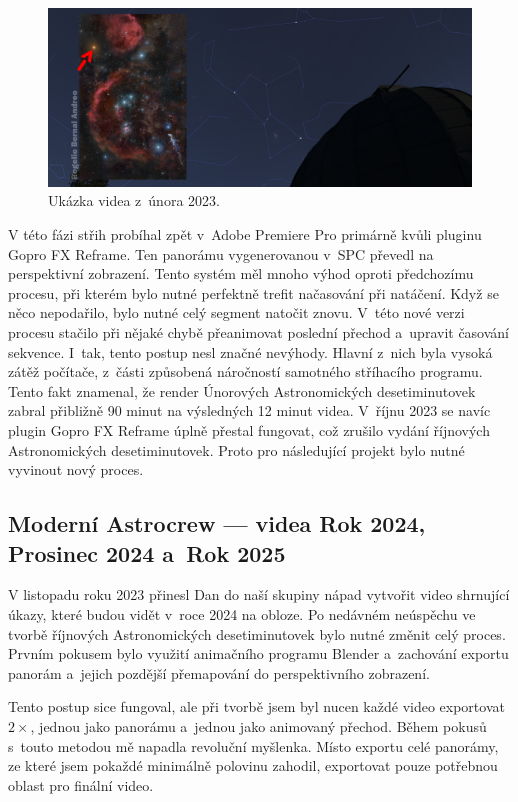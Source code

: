 \documentclass[12pt,a4paper,titlepage]{article}
\begin{document}
\begin{figure}[H]
	\centering
	\includegraphics[width=.85\textwidth]{unor.png}
	\caption{Ukázka videa z~února 2023.}\label{img:unor}
\end{figure}

V této fázi střih probíhal zpět v~Adobe Premiere Pro primárně kvůli pluginu Gopro FX Reframe. Ten panorámu vygenerovanou v~SPC převedl na perspektivní zobrazení. Tento systém měl mnoho výhod oproti předchozímu procesu, při kterém bylo nutné perfektně trefit načasování při natáčení. Když se něco nepodařilo, bylo nutné celý segment natočit znovu. V~této nové verzi procesu stačilo při nějaké chybě přeanimovat poslední přechod a~upravit časování sekvence. I~tak, tento postup nesl značné nevýhody. Hlavní z~nich byla vysoká zátěž počítače, z~části způsobená náročností samotného stříhacího programu. Tento fakt znamenal, že render Únorových Astronomických desetiminutovek zabral přibližně 90 minut na výsledných 12 minut videa. V~říjnu 2023 se navíc plugin Gopro FX Reframe úplně přestal fungovat, což zrušilo vydání říjnových Astronomických desetiminutovek. Proto pro následující projekt bylo nutné vyvinout nový proces. 
\subsection{Moderní Astrocrew --- videa Rok 2024, Prosinec 2024 a~Rok 2025}
V listopadu roku 2023 přinesl Dan do naší skupiny nápad vytvořit video shrnující úkazy, které budou vidět v~roce 2024 na obloze. Po nedávném neúspěchu ve tvorbě říjnových Astronomických desetiminutovek bylo nutné změnit celý proces. Prvním pokusem bylo využití animačního programu Blender a~zachování exportu panorám a~jejich pozdější přemapování do perspektivního zobrazení. 

Tento postup sice fungoval, ale při tvorbě jsem byl nucen každé video exportovat \(2\times \), jednou jako panorámu a~jednou jako animovaný přechod. Během pokusů s~touto metodou mě napadla revoluční myšlenka. Místo exportu celé panorámy, ze které jsem pokaždé minimálně polovinu zahodil, exportovat pouze potřebnou oblast pro finální video. 
\end{document}

